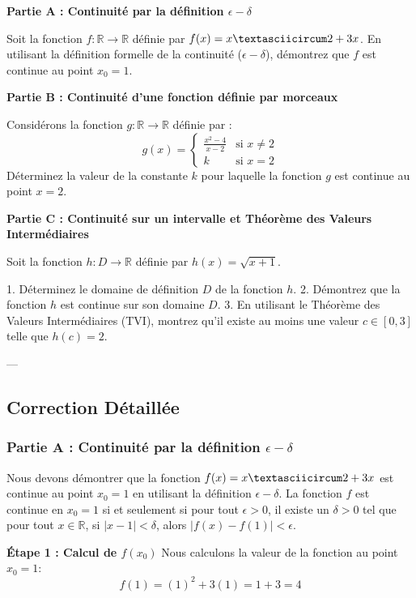 \documentclass[12pt,a4paper]{report}
\begin{document}
\textbf{Partie A : Continuité par la définition $\epsilon-\delta$}

Soit la fonction $f: \mathbb{R} \to \mathbb{R}$ définie par $f(x) = x\textasciicircum 2 + 3x$.
En utilisant la définition formelle de la continuité ($\epsilon-\delta$), démontrez que $f$ est continue au point $x_0 = 1$.

\textbf{Partie B : Continuité d'une fonction définie par morceaux}

Considérons la fonction $g: \mathbb{R} \to \mathbb{R}$ définie par :
$$ g(x) = \begin{cases} \frac{x^2 - 4}{x - 2} & \text{si } x \neq 2 \\ k & \text{si } x = 2 \end{cases} $$
Déterminez la valeur de la constante $k$ pour laquelle la fonction $g$ est continue au point $x = 2$.

\textbf{Partie C : Continuité sur un intervalle et Théorème des Valeurs Intermédiaires}

Soit la fonction $h: D \to \mathbb{R}$ définie par $h(x) = \sqrt{x+1}$.

1.  Déterminez le domaine de définition $D$ de la fonction $h$.
2.  Démontrez que la fonction $h$ est continue sur son domaine $D$.
3.  En utilisant le Théorème des Valeurs Intermédiaires (TVI), montrez qu'il existe au moins une valeur $c \in [0, 3]$ telle que $h(c) = 2$.

---

\subsection{Correction Détaillée}

\subsubsection{Partie A : Continuité par la définition $\epsilon-\delta$}

Nous devons démontrer que la fonction $f(x) = x\textasciicircum 2 + 3x$ est continue au point $x_0 = 1$ en utilisant la définition $\epsilon-\delta$.
La fonction $f$ est continue en $x_0 = 1$ si et seulement si pour tout $\epsilon > 0$, il existe un $\delta > 0$ tel que pour tout $x \in \mathbb{R}$, si $|x - 1| < \delta$, alors $|f(x) - f(1)| < \epsilon$.

\textbf{Étape 1 : Calcul de $f(x_0)$}
Nous calculons la valeur de la fonction au point $x_0 = 1$:
$$ f(1) = (1)^2 + 3(1) = 1 + 3 = 4 $$
\end{document}
